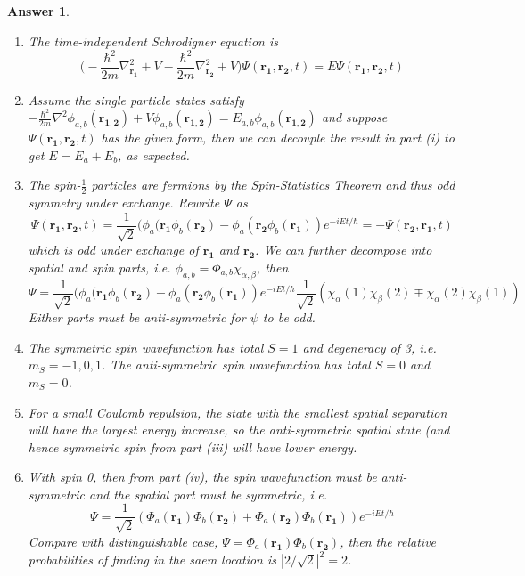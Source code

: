 \documentclass[a4paper]{article}
\newtheorem{ans}{Answer}[subsection]
\theoremstyle{new}
\begin{document}
\begin{ans}\leavevmode
\begin{enumerate}[label=(\roman*)]
\item The time-independent Schrodigner equation is
$$\bigg(-\frac{\hbar^2}{2m}\nabla^2_{\mathbf{r_1}}+V-\frac{\hbar^2}{2m}\nabla^2_{\mathbf{r_2}}+V\bigg)\Psi(\mathbf{r_1},\mathbf{r_2},t)=E\Psi(\mathbf{r_1},\mathbf{r_2},t)$$
\item Assume the single particle states satisfy $-\frac{\hbar^2}{2m}\nabla^2\phi_{a,b}(\mathbf{r_{1,2}})+V\phi_{a,b}(\mathbf{r_{1,2}})=E_{a,b}\phi_{a,b}(\mathbf{r_{1,2}})$ and suppose $\Psi(\mathbf{r_1},\mathbf{r_2},t)$ has the given form, then we can decouple the result in part (i) to get $E=E_a+E_b$, as expected.
\item The spin-$\frac{1}{2}$ particles are fermions by the Spin-Statistics Theorem and thus odd symmetry under exchange. Rewrite $\Psi$ as
$$\Psi(\mathbf{r_1},\mathbf{r_2},t)=\frac{1}{\sqrt{2}}(\phi_a(\mathbf{r_1}\phi_b(\mathbf{r_2})-\phi_a(\mathbf{r_2}\phi_b(\mathbf{r_1}))e^{-iEt/\hbar}=-\Psi(\mathbf{r_2},\mathbf{r_1},t)$$
which is odd under exchange of $\mathbf{r_1}$ and $\mathbf{r_2}$. We can further decompose into spatial and spin parts, i.e. $\phi_{a,b}=\Phi_{a,b}\chi_{\alpha,\beta}$, then
$$\Psi=\frac{1}{\sqrt{2}}(\phi_a(\mathbf{r_1}\phi_b(\mathbf{r_2})-\phi_a(\mathbf{r_2}\phi_b(\mathbf{r_1}))e^{-iEt/\hbar}\frac{1}{\sqrt{2}}(\chi_\alpha(1)\chi_\beta(2)\mp\chi_\alpha(2)\chi_\beta(1))$$
Either parts must be anti-symmetric for $\psi$ to be odd.
\item The symmetric spin wavefunction has total $S=1$ and degeneracy of 3, i.e. $m_S=-1,0,1$. The anti-symmetric spin wavefunction has total $S=0$ and $m_S=0$.
\item For a small Coulomb repulsion, the state with the smallest spatial separation will have the largest energy increase, so the anti-symmetric spatial state (and hence symmetric spin from part (iii) will have lower energy.
\item With spin 0, then from part (iv), the spin wavefunction must be anti-symmetric and the spatial part must be symmetric, i.e.
$$\Psi=\frac{1}{\sqrt{2}}(\Phi_a(\mathbf{r_1})\Phi_b(\mathbf{r_2})+\Phi_a(\mathbf{r_2})\Phi_b(\mathbf{r_1}))e^{-iEt/\hbar}$$
Compare with distinguishable case, $\Psi=\Phi_a(\mathbf{r_1})\Phi_b(\mathbf{r_2})$, then the relative probabilities of finding in the saem location is $|2/\sqrt{2}|^2=2$.
\end{enumerate}
\end{ans}
\newpage
\end{document}
